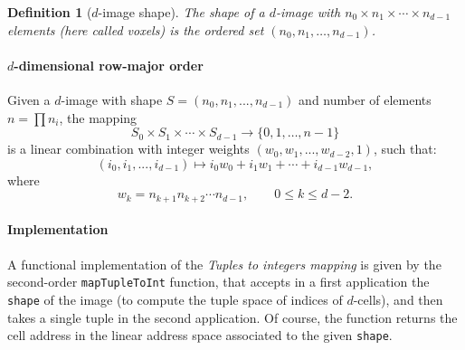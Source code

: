 \documentclass[11pt,oneside]{article}	%
\newtheorem{definition}{Definition}
\begin{document}
\begin{definition}[$d$-image shape]
The \emph{shape} of a $d$-image with $n_0\times n_1 \times\cdots\times n_{d-1}$ elements (here called \emph{voxels}) is the ordered set $(n_0, n_1, \ldots, n_{d-1})$.
\end{definition}


\paragraph{$d$-dimensional row-major order}

Given a $d$-image with shape $S=(n_0,n_1,...,n_{d-1})$ and number of elements $n=\prod n_i$, 
the mapping  
\[
S_0 \times S_1 \times \cdots \times S_{d-1} \to \{ 0, 1, \ldots, n-1\}
\]
 is a {linear combination} with integer {weights}  $(w_0,w_1,...,w_{d-2},1)$, such that:
\[
(i_0,i_1,...,i_{d-1}) \mapsto i_0 w_0 +i_1 w_1 +\cdots +i_{d-1} w_{d-1},
\]
where 
\[
w_k = n_{k+1}  n_{k+2} \cdots  n_{d-1}, \qquad 0\leq k\leq d-2.
\]

\paragraph{Implementation}
A functional implementation of the \emph{Tuples to integers mapping} is given by the second-order  \texttt{mapTupleToInt} function, that  accepts in a first application the \texttt{shape} of the image (to compute the tuple space of indices of $d$-cells), and then takes a single tuple in the second application. Of course, the function  returns the cell address in the linear address space associated to the given \texttt{shape}.
\end{document}
